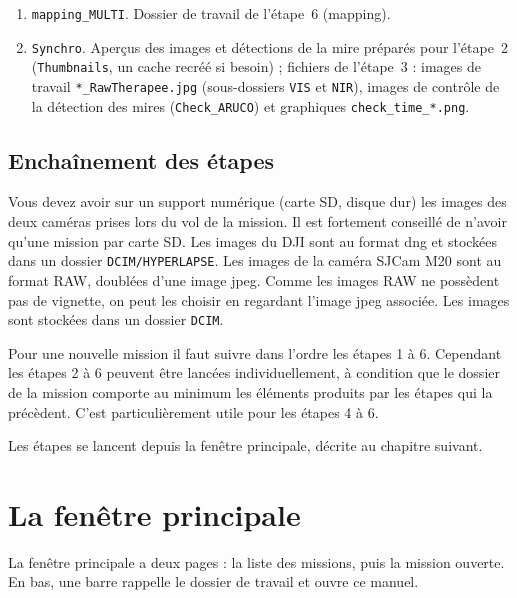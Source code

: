 \documentclass[a4paper,11pt]{report}
\newcommand{\todo}[1]{\textcolor{red}{[\`A r\'ediger : #1]}}
\begin{document}
\begin{enumerate}
\begin{itemize}
		\end{itemize}
	\item \texttt{mapping\_MULTI}. Dossier de travail de l'étape~6 (mapping).
	\item \texttt{Synchro}. Aperçus des images et détections de la mire préparés pour l'étape~2 (\texttt{Thumbnails}, un cache recréé si besoin) ; fichiers de l'étape~3 : images de travail \texttt{*\_RawTherapee.jpg} (sous-dossiers \texttt{VIS} et \texttt{NIR}), images de contrôle de la détection des mires (\texttt{Check\_ARUCO}) et graphiques \texttt{check\_time\_*.png}.
\end{enumerate}

\section{Encha\^inement des \'etapes}
Vous devez avoir sur un support numérique (carte SD, disque dur) les images des deux caméras prises lors du vol de la mission. Il est fortement conseillé de n'avoir qu'une mission par carte SD. Les images du DJI sont au format dng et stockées dans un dossier \texttt{DCIM/HYPERLAPSE}. Les images de la caméra SJCam M20 sont au format RAW, doublées d'une image jpeg. Comme les images RAW ne possèdent pas de vignette, on peut les choisir en regardant l'image jpeg associée. Les images sont stockées dans un dossier \texttt{DCIM}.

Pour une nouvelle mission il faut suivre dans l'ordre les étapes 1 à 6. 
Cependant les étapes 2 à 6 peuvent être lancées individuellement, à condition que le dossier de la mission comporte au minimum les éléments produits par les étapes qui la précèdent. C'est particulièrement utile pour les étapes 4 à 6.

Les étapes se lancent depuis la fenêtre principale, décrite au chapitre suivant.

\chapter{La fenêtre principale}\label{ch:home}
La fenêtre principale a deux pages : la liste des missions, puis la mission ouverte. En bas, une barre rappelle le dossier de travail et ouvre ce manuel.
\end{document}
